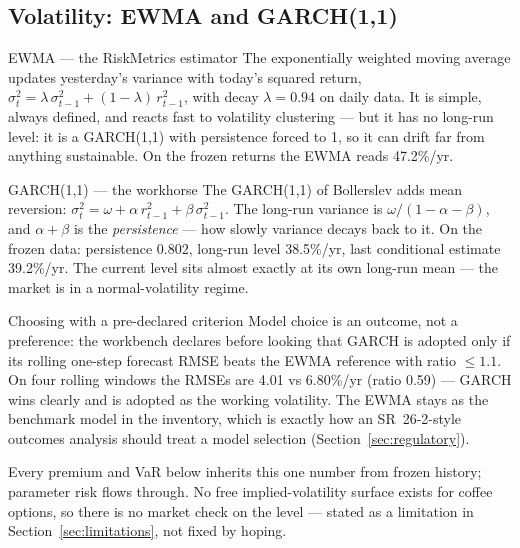\documentclass[11pt,a4paper]{article}
\begin{document}
\subsection{Volatility: EWMA and GARCH(1,1)}

\begin{concept}{EWMA --- the RiskMetrics estimator}
The exponentially weighted moving average \cite{riskmetrics96} updates
yesterday's variance with today's squared return,
$\sigma_t^2 = \lambda\,\sigma_{t-1}^2 + (1-\lambda)\,r_{t-1}^2$, with
decay $\lambda = 0.94$ on daily data. It is simple, always defined, and
reacts fast to volatility clustering --- but it has no long-run level: it
is a GARCH(1,1) with persistence forced to 1, so it can drift far from
anything sustainable. On the frozen returns the EWMA reads 47.2\%/yr.
\end{concept}

\begin{concept}{GARCH(1,1) --- the workhorse}
The GARCH(1,1) of Bollerslev \cite{bollerslev86} adds mean reversion:
$\sigma_t^2 = \omega + \alpha\,r_{t-1}^2 + \beta\,\sigma_{t-1}^2$. The
long-run variance is $\omega/(1-\alpha-\beta)$, and $\alpha+\beta$ is the
\emph{persistence} --- how slowly variance decays back to it. On the
frozen data: persistence $0.802$, long-run level 38.5\%/yr, last
conditional estimate 39.2\%/yr. The current level sits almost exactly at
its own long-run mean --- the market is in a normal-volatility regime.
\end{concept}

\begin{concept}{Choosing with a pre-declared criterion}
Model choice is an outcome, not a preference: the workbench declares
before looking that GARCH is adopted only if its rolling one-step forecast
RMSE beats the EWMA reference with ratio $\leq 1.1$. On four rolling
windows the RMSEs are 4.01 vs 6.80\%/yr (ratio 0.59) --- GARCH wins
clearly and is adopted as the working volatility. The EWMA stays as the
benchmark model in the inventory, which is exactly how an
SR~26-2-style outcomes analysis should treat a model selection
(Section~\ref{sec:regulatory}).
\end{concept}

\begin{pitfall}
Every premium and VaR below inherits this one number from frozen history;
parameter risk flows through. No free implied-volatility surface exists
for coffee options, so there is no market check on the level --- stated
as a limitation in Section~\ref{sec:limitations}, not fixed by hoping.
\end{pitfall}
\end{document}
